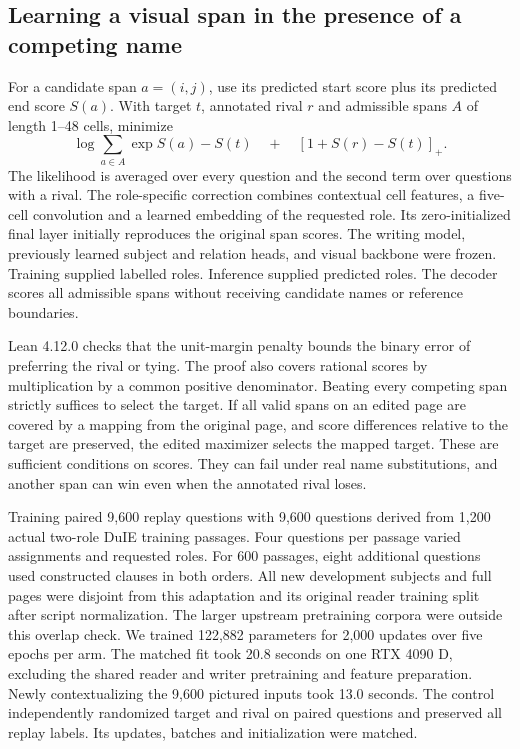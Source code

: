\documentclass[12pt,a4paper]{article}
\providecommand{\DIFadd}[1]{{\protect\color{blue} \sf #1}} %
\begin{document}
\subsection*{\DIFadd{Learning a visual span in the presence of a competing name}}
\DIFadd{For a candidate span $a=(i,j)$, use its predicted start score plus its predicted end score $S(a)$. With target $t$, annotated rival $r$ and admissible spans $A$ of length 1--48 cells, minimize
}\[
\log\sum_{a\in A} \exp S(a)-S(t)
\quad +\quad [1+S(r)-S(t)]_+ .
\]
\DIFadd{The likelihood is averaged over every question and the second term over questions with a rival. The role-specific correction combines contextual cell features, a five-cell convolution and a learned embedding of the requested role. Its zero-initialized final layer initially reproduces the original span scores. The writing model, previously learned subject and relation heads, and visual backbone were frozen. Training supplied labelled roles. Inference supplied predicted roles. The decoder scores all admissible spans without receiving candidate names or reference boundaries.
}

\DIFadd{Lean 4.12.0 checks that the unit-margin penalty bounds the binary error of preferring the rival or tying. The proof also covers rational scores by multiplication by a common positive denominator. Beating every competing span strictly suffices to select the target. If all valid spans on an edited page are covered by a mapping from the original page, and score differences relative to the target are preserved, the edited maximizer selects the mapped target. These are sufficient conditions on scores. They can fail under real name substitutions, and another span can win even when the annotated rival loses.
}

\DIFadd{Training paired 9,600 replay questions with 9,600 questions derived from 1,200 actual two-role DuIE training passages. Four questions per passage varied assignments and requested roles. For 600 passages, eight additional questions used constructed clauses in both orders. All new development subjects and full pages were disjoint from this adaptation and its original reader training split after script normalization. The larger upstream pretraining corpora were outside this overlap check. We trained 122,882 parameters for 2,000 updates over five epochs per arm. The matched fit took 20.8 seconds on one RTX 4090 D, excluding the shared reader and writer pretraining and feature preparation. Newly contextualizing the 9,600 pictured inputs took 13.0 seconds. The control independently randomized target and rival on paired questions and preserved all replay labels. Its updates, batches and initialization were matched.
}
\end{document}
